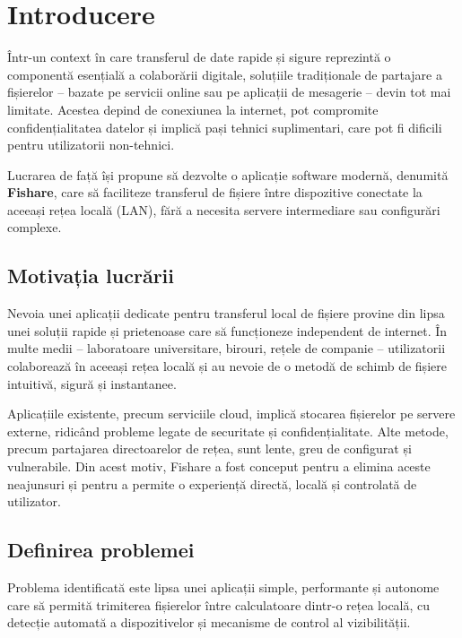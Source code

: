 \documentclass[12pt,a4paper]{report}
\begin{document}
\newpage

\tableofcontents
\newpage

\chapter{Introducere}

Într-un context în care transferul de date rapide și sigure reprezintă o componentă esențială a colaborării digitale, soluțiile tradiționale de partajare a fișierelor -- bazate pe servicii online sau pe aplicații de mesagerie -- devin tot mai limitate. Acestea depind de conexiunea la internet, pot compromite confidențialitatea datelor și implică pași tehnici suplimentari, care pot fi dificili pentru utilizatorii non-tehnici.

Lucrarea de față își propune să dezvolte o aplicație software modernă, denumită \textbf{Fishare}, care să faciliteze transferul de fișiere între dispozitive conectate la aceeași rețea locală (LAN), fără a necesita servere intermediare sau configurări complexe.

\section*{Motivația lucrării}

Nevoia unei aplicații dedicate pentru transferul local de fișiere provine din lipsa unei soluții rapide și prietenoase care să funcționeze independent de internet. În multe medii -- laboratoare universitare, birouri, rețele de companie -- utilizatorii colaborează în aceeași rețea locală și au nevoie de o metodă de schimb de fișiere intuitivă, sigură și instantanee.

Aplicațiile existente, precum serviciile cloud, implică stocarea fișierelor pe servere externe, ridicând probleme legate de securitate și confidențialitate. Alte metode, precum partajarea directoarelor de rețea, sunt lente, greu de configurat și vulnerabile. Din acest motiv, Fishare a fost conceput pentru a elimina aceste neajunsuri și pentru a permite o experiență directă, locală și controlată de utilizator.

\section*{Definirea problemei}

Problema identificată este lipsa unei aplicații simple, performante și autonome care să permită trimiterea fișierelor între calculatoare dintr-o rețea locală, cu detecție automată a dispozitivelor și mecanisme de control al vizibilității.
\end{document}
